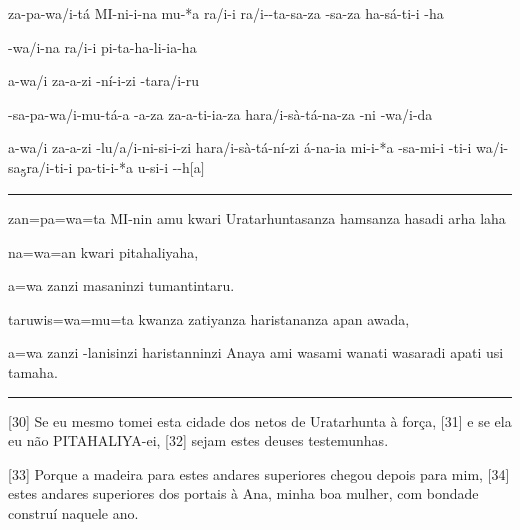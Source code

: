 \setcounter{parcount}{29}
\begin{parnumbersa}[]

	\raggedright%
	\itshape%


	\lmasc{}za-pa-wa/i-tá \lmasc{}MI-ni-i-na mu-*a
	\lmasc{}ra/i-i \spac{}ra/i--ta-sa-za
	\lmasc{}-sa-za \lmasc{}ha-sá-ti-i  \lmasc{}-ha

	\lmasc{}-wa/i-na \lmasc{}ra/i-i pi-ta-ha-li-ia-ha

	a-wa/i \lmasc{}za-a-zi \lmasc{}-ní-i-zi \lmasc{}-ta\logo{+}ra/i-ru

	-sa-pa\lbreak{}-wa/i-mu-tá-a \lmasc{}-a-za za-a-ti-ia-za \lmasc{}ha\logo{+}ra/i-sà-tá-na-za -ni \lmasc{}-wa/i-da

	a-wa/i \lmasc{}za-a-zi -lu/a/i-ni-si-i-zi
	ha\logo{+}ra/i-sà-tá-ní-zi \spac{}á-na-ia mi-i-*a
	\lmasc{}-sa-mi-i -ti-i
	\lmasc{}wa/i-sa\textsubscript{5}\logo{+}ra/i-ti-i pa-ti-i-*a \lmasc{}u-si-i --h$[$a$]$


\end{parnumbersa}

\vspace{10pt}
\hrule
\vspace{10pt}


\setcounter{parcount}{29}
\begin{parnumbersa}[]

	\raggedright%
	\itshape%


	zan=pa=wa=ta MI-nin amu kwari Uratarhuntasanza hamsanza hasadi arha laha

	na=wa=an kwari pitahaliyaha,

	a=wa zanzi masaninzi tumantintaru.

	taruwis=wa=mu=ta kwanza zatiyanza haristananza apan awada,

	a=wa zanzi -lanisinzi haristanninzi Anaya ami wasami wanati wasaradi
	apati usi tamaha.


\end{parnumbersa}

\vspace{10pt}
\hrule
\vspace{10pt}


[30] Se eu mesmo tomei esta cidade dos netos de Uratarhunta à força,
[31] e se ela eu não PITAHALIYA-ei,
[32] sejam estes deuses testemunhas.

	[33] Porque a madeira para estes andares superiores chegou depois para mim,
[34] estes andares superiores dos portais à Ana, minha boa mulher, com bondade
construí naquele ano.




